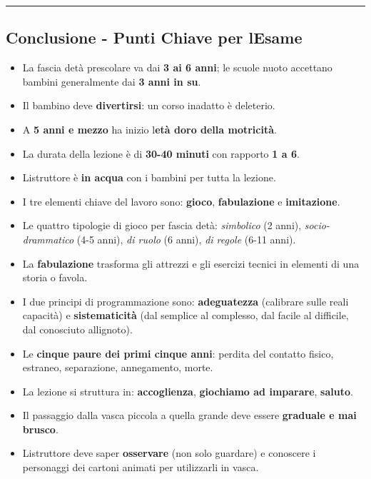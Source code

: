 \documentclass[a4paper,11pt]{article}
\providecommand{\tightlist}{%
  \setlength{\itemsep}{0pt}\setlength{\parskip}{0pt}}
\begin{document}
\begin{center}\rule{0.5\linewidth}{0.5pt}\end{center}

\subsection{Conclusione - Punti Chiave per
      l\textquotesingle Esame}\label{conclusione---punti-chiave-per-lesame-7}

\begin{itemize}
      \tightlist
      \item
            La fascia d\textquotesingle età prescolare va dai \textbf{3 ai 6
                  anni}; le scuole nuoto accettano bambini generalmente dai \textbf{3
                  anni in su}.
      \item
            Il bambino deve \textbf{divertirsi}: un corso inadatto è deleterio.
      \item
            A \textbf{5 anni e mezzo} ha inizio l\textquotesingle{}\textbf{età
                  d\textquotesingle oro della motricità}.
      \item
            La durata della lezione è di \textbf{30-40 minuti} con rapporto
            \textbf{1 a 6}.
      \item
            L\textquotesingle istruttore è \textbf{in acqua} con i bambini per
            tutta la lezione.
      \item
            I tre elementi chiave del lavoro sono: \textbf{gioco},
            \textbf{fabulazione} e \textbf{imitazione}.
      \item
            Le quattro tipologie di gioco per fascia d\textquotesingle età:
            \emph{simbolico} (2 anni), \emph{socio-drammatico} (4-5 anni),
            \emph{di ruolo} (6 anni), \emph{di regole} (6-11 anni).
      \item
            La \textbf{fabulazione} trasforma gli attrezzi e gli esercizi tecnici
            in elementi di una storia o favola.
      \item
            I due principi di programmazione sono: \textbf{adeguatezza} (calibrare
            sulle reali capacità) e \textbf{sistematicità} (dal semplice al
            complesso, dal facile al difficile, dal conosciuto
            all\textquotesingle ignoto).
      \item
            Le \textbf{cinque paure dei primi cinque anni}: perdita del contatto
            fisico, estraneo, separazione, annegamento, morte.
      \item
            La lezione si struttura in: \textbf{accoglienza}, \textbf{giochiamo ad
                  imparare}, \textbf{saluto}.
      \item
            Il passaggio dalla vasca piccola a quella grande deve essere
            \textbf{graduale e mai brusco}.
      \item
            L\textquotesingle istruttore deve saper \textbf{osservare} (non solo
            guardare) e conoscere i personaggi dei cartoni animati per utilizzarli
            in vasca.
\end{itemize}
\end{document}
